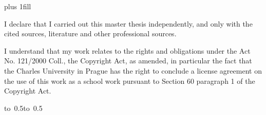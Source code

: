 \documentclass[12pt,a4paper]{report}
\let\openright=\clearpage
\begin{document}
\newpage



\openright

\noindent
{}

\newpage


\vglue 0pt plus 1fill

\noindent
I declare that I carried out this master thesis independently, and only with the cited
sources, literature and other professional sources.

\medskip\noindent
I understand that my work relates to the rights and obligations under the Act No.
121/2000 Coll., the Copyright Act, as amended, in particular the fact that the Charles
University in Prague has the right to conclude a license agreement on the use of this
work as a school work pursuant to Section 60 paragraph 1 of the Copyright Act.

\vspace{10mm}

\hbox{\hbox to 0.5\hbox to 0.5}

\vspace{20mm}
\newpage

\end{document}
